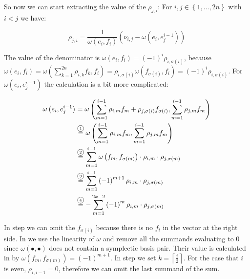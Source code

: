 \documentclass[../SymplecticSimplices.tex]{subfiles}
\begin{document}
So now we can start extracting the value of the \( \rho_{j,i} \): For \( i,j \in \left\lbrace 1, \dots, 2n \right\rbrace \) with \( i < j \) we have:

\begin{equation*}
  \rho_{j,i} = \frac{1}{\omega\left( e_i, f_i \right)} \left( \nu_{i,j} - \omega \left( e_i, e_j^{i-1} \right) \right)
\end{equation*}

The value of the denominator is \( \omega\left( e_i, f_i \right) = \left( -1 \right)^{i} \rho_{i, \sigma \left( i \right)} \), because \( \omega\left( e_i, f_i \right) = \omega \left( \sum_{k=1}^{2n} \rho_{i,k} f_k, f_i \right) = \rho_{i,\sigma \left( i \right)} \omega \left( f_{\sigma \left( i \right)}, f_i \right) = \left( -1 \right)^{i} \rho_{i, \sigma \left( i \right)} \). For \( \omega \left( e_i, e_j^{i-1} \right) \) the calculation is a bit more complicated:

\begin{equation*}
  \begin{split}
    \omega \left( e_i, e_j^{i-1} \right) &
    = \omega \left( \sum_{m=1}^{i-1} \rho_{i, m} f_m + \rho_{j,\sigma \left( i \right)} f_{\sigma \left( i \right)}, \sum_{m=1}^{i-1} \rho_{j, m} f_m \right) \\ &
    \eqcom{1} \omega \left( \sum_{m=1}^{i-1} \rho_{i, m} f_m, \sum_{m=1}^{i-1} \rho_{j, m} f_m \right) \\ &
    \eqcom{2} \sum_{m=1}^{i-1} \omega \left( f_m, f_{\sigma \left( m \right)} \right) \cdot \rho_{i, m} \cdot \rho_{j, \sigma \left( m \right)} \\ &
    \eqcom{3} \sum_{m=1}^{i-1} \left( -1 \right)^{m+1} \rho_{i, m} \cdot \rho_{j, \sigma \left( m \right)} \\ &
    \eqcom{4} -\sum \limits _{m=1} ^{2k-2} \left( -1 \right) ^{m} \rho_{i, m} \cdot \rho_{j, \sigma \left( m \right)}
  \end{split}
\end{equation*}

In step  we can omit the \( f_{\sigma \left( i \right)} \) because there is no \( f_i \) in the vector at the right side. In  we use the linearity of \( \omega \) and remove all the summands evaluating to \( 0 \) since \( \omega \left( \bullet, \bullet \right) \) does not contain a symplectic basis pair. Their value is calculated in  by \( \omega \left( f_m, f_{\sigma \left( m \right)} \right) = \left( -1 \right)^{m+1} \). In step  we set \( k = \left\lceil \frac{i}{2} \right\rceil \). For the case that \( i \) is even, \( \rho_{i, i-1} = 0  \), therefore we can omit the last summand of the sum.  
\end{document}
